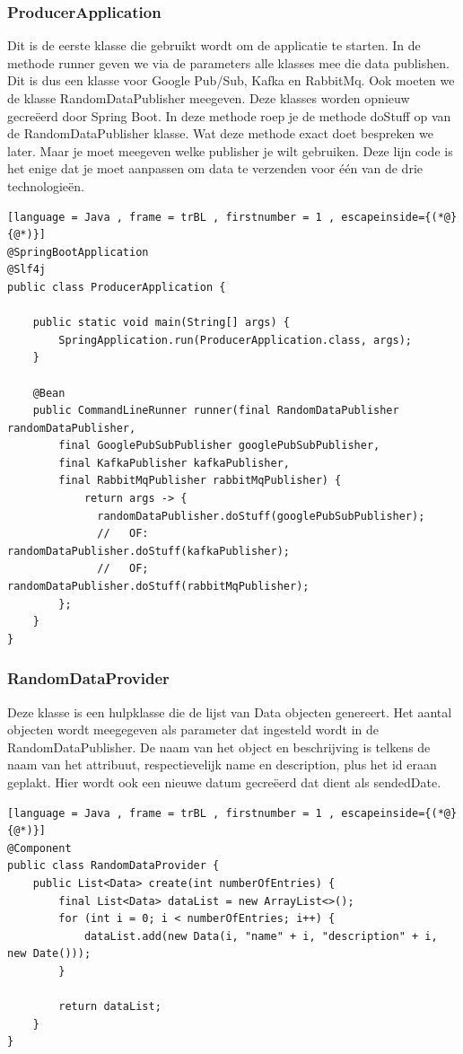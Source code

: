 \subsubsection{ProducerApplication}
Dit is de eerste klasse die gebruikt wordt om de applicatie te starten. In de methode runner geven we via de parameters alle klasses mee die data publishen. Dit is dus een klasse voor Google Pub/Sub, Kafka en RabbitMq. Ook moeten we de klasse RandomDataPublisher meegeven. Deze klasses worden opnieuw gecreëerd door Spring Boot. In deze methode roep je de methode doStuff op van de RandomDataPublisher klasse. Wat deze methode exact doet bespreken we later. Maar je moet meegeven welke publisher je wilt gebruiken. Deze lijn code is het enige dat je moet aanpassen om data te verzenden voor één van de drie technologieën.

\begin{lstlisting}[language = Java , frame = trBL , firstnumber = 1 , escapeinside={(*@}{@*)}]
@SpringBootApplication
@Slf4j
public class ProducerApplication {
    
    public static void main(String[] args) {
        SpringApplication.run(ProducerApplication.class, args);
    }
    
    @Bean
    public CommandLineRunner runner(final RandomDataPublisher randomDataPublisher,
        final GooglePubSubPublisher googlePubSubPublisher,
        final KafkaPublisher kafkaPublisher,
        final RabbitMqPublisher rabbitMqPublisher) {
            return args -> {
              randomDataPublisher.doStuff(googlePubSubPublisher);
              //   OF:         randomDataPublisher.doStuff(kafkaPublisher);
              //   OF;         randomDataPublisher.doStuff(rabbitMqPublisher);
        };
    }
}
     \end{lstlisting}
\subsubsection{RandomDataProvider}
Deze klasse is een hulpklasse die de lijst van Data objecten genereert. Het aantal objecten wordt meegegeven als parameter dat ingesteld wordt in de RandomDataPublisher. De naam van het object en beschrijving is telkens de naam van het attribuut, respectievelijk name en description, plus het id eraan geplakt. Hier wordt ook een nieuwe datum gecreëerd dat dient als sendedDate.
\begin{lstlisting}[language = Java , frame = trBL , firstnumber = 1 , escapeinside={(*@}{@*)}]
@Component
public class RandomDataProvider {
    public List<Data> create(int numberOfEntries) {
        final List<Data> dataList = new ArrayList<>();
        for (int i = 0; i < numberOfEntries; i++) {
            dataList.add(new Data(i, "name" + i, "description" + i, new Date()));
        }
        
        return dataList;
    }
}
           \end{lstlisting}

